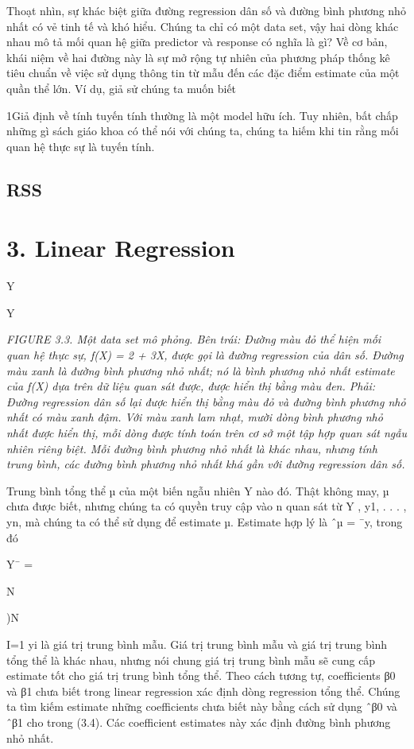 Thoạt nhìn, sự khác biệt giữa đường regression dân số và đường bình phương nhỏ nhất có vẻ tinh tế và khó hiểu. Chúng ta chỉ có một data set, vậy hai dòng khác nhau mô tả mối quan hệ giữa predictor và response có nghĩa là gì? Về cơ bản, khái niệm về hai đường này là sự mở rộng tự nhiên của phương pháp thống kê tiêu chuẩn về việc sử dụng thông tin từ mẫu đến các đặc điểm estimate của một quần thể lớn. Ví dụ, giả sử chúng ta muốn biết

1Giả định về tính tuyến tính thường là một model hữu ích. Tuy nhiên, bất chấp những gì sách giáo khoa có thể nói với chúng ta, chúng ta hiếm khi tin rằng mối quan hệ thực sự là tuyến tính.

\subsection{RSS}

\section{3. Linear Regression}

Y

Y

\noindent\textit{FIGURE 3.3. Một data set mô phỏng. Bên trái: Đường màu đỏ thể hiện mối quan hệ thực sự, f(X) = 2 + 3X, được gọi là đường regression của dân số. Đường màu xanh là đường bình phương nhỏ nhất; nó là bình phương nhỏ nhất estimate của f(X) dựa trên dữ liệu quan sát được, được hiển thị bằng màu đen. Phải: Đường regression dân số lại được hiển thị bằng màu đỏ và đường bình phương nhỏ nhất có màu xanh đậm. Với màu xanh lam nhạt, mười dòng bình phương nhỏ nhất được hiển thị, mỗi dòng được tính toán trên cơ sở một tập hợp quan sát ngẫu nhiên riêng biệt. Mỗi đường bình phương nhỏ nhất là khác nhau, nhưng tính trung bình, các đường bình phương nhỏ nhất khá gần với đường regression dân số.}

Trung bình tổng thể µ của một biến ngẫu nhiên Y nào đó. Thật không may, µ chưa được biết, nhưng chúng ta có quyền truy cập vào n quan sát từ Y , y1, . . . , yn, mà chúng ta có thể sử dụng để estimate µ. Estimate hợp lý là ˆµ = ¯y, trong đó

Y¯ =

N

)N

I=1 yi là giá trị trung bình mẫu. Giá trị trung bình mẫu và giá trị trung bình tổng thể là khác nhau, nhưng nói chung giá trị trung bình mẫu sẽ cung cấp estimate tốt cho giá trị trung bình tổng thể. Theo cách tương tự, coefficients β0 và β1 chưa biết trong linear regression xác định dòng regression tổng thể. Chúng ta tìm kiếm estimate những coefficients chưa biết này bằng cách sử dụng ˆβ0 và ˆβ1 cho trong (3.4). Các coefficient estimates này xác định đường bình phương nhỏ nhất.

